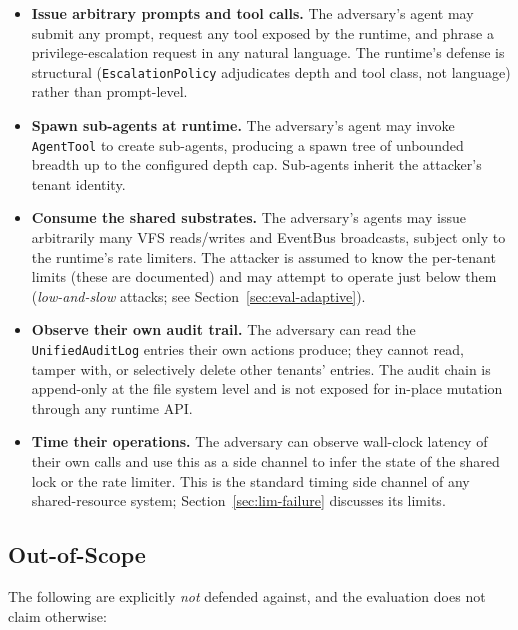 \begin{itemize}
    \item \textbf{Issue arbitrary prompts and tool calls.} The
    adversary's agent may submit any prompt, request any tool exposed
    by the runtime, and phrase a privilege-escalation request in any
    natural language. The runtime's defense is structural
    (\texttt{EscalationPolicy} adjudicates depth and tool class, not
    language) rather than prompt-level.

    \item \textbf{Spawn sub-agents at runtime.} The adversary's agent
    may invoke \texttt{AgentTool} to create sub-agents, producing a
    spawn tree of unbounded breadth up to the configured depth cap.
    Sub-agents inherit the attacker's tenant identity.

    \item \textbf{Consume the shared substrates.} The adversary's agents
    may issue arbitrarily many VFS reads/writes and EventBus
    broadcasts, subject only to the runtime's rate limiters. The
    attacker is assumed to know the per-tenant limits (these are
    documented) and may attempt to operate just below them
    (\emph{low-and-slow} attacks; see Section~\ref{sec:eval-adaptive}).

    \item \textbf{Observe their own audit trail.} The adversary can
    read the \texttt{UnifiedAuditLog} entries their own actions
    produce; they cannot read, tamper with, or selectively delete
    other tenants' entries. The audit chain is append-only at the file
    system level and is not exposed for in-place mutation through any
    runtime API.

    \item \textbf{Time their operations.} The adversary can observe
    wall-clock latency of their own calls and use this as a side
    channel to infer the state of the shared lock or the rate limiter.
    This is the standard timing side channel of any shared-resource
    system; Section~\ref{sec:lim-failure} discusses its limits.
\end{itemize}

\subsection{Out-of-Scope}
\label{sec:threat-out}

The following are explicitly \emph{not} defended against, and the
evaluation does not claim otherwise:

